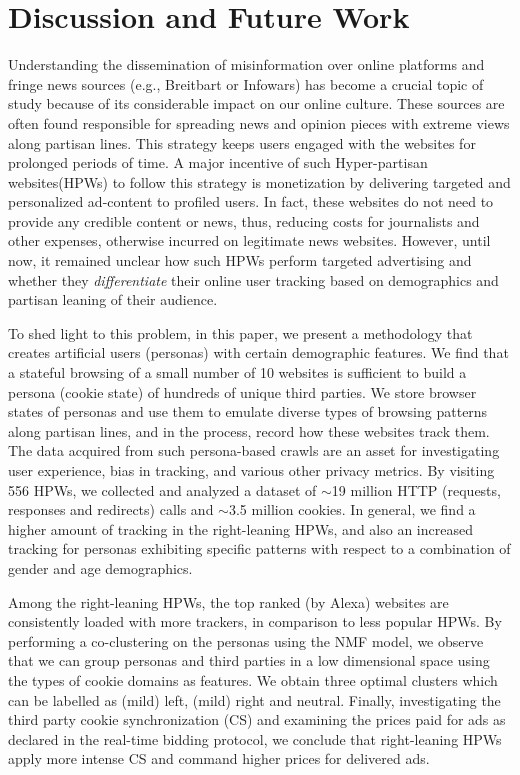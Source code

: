 \documentclass{article}
\newcommand{\hpws}{HPWs\xspace}
\newcommand{\hpwlongs}{Hyper-partisan websites\xspace}
\newcommand{\visitedSites}{556\xspace}
\begin{document}
\section{Discussion and Future Work} \label{sec:conclusion}


Understanding the dissemination of misinformation over online platforms and fringe news sources (e.g., Breitbart or Infowars) has become a crucial topic of study because of its considerable impact on our online culture.
These sources are often found responsible for spreading news and opinion pieces with extreme views along partisan lines.
This strategy keeps users engaged with the websites for prolonged periods of time.
A major incentive of such \hpwlongs (\hpws) to follow this strategy is monetization by delivering targeted and personalized ad-content to profiled users.
In fact, these websites do not need to provide any credible content or news, thus, reducing costs for journalists and other expenses, otherwise incurred on legitimate news websites.
However, until now, it remained unclear how such \hpws perform targeted advertising and whether they \emph{differentiate} their online user tracking based on demographics and partisan leaning of their audience.

To shed light to this problem, in this paper, we present a methodology that creates artificial users (personas) with certain demographic features.
We find that a stateful browsing of a small number of 10 websites is sufficient to build a persona (cookie state) of hundreds of unique third parties.
We store browser states of personas and use them to emulate diverse types of browsing patterns along partisan lines, and in the process, record how these websites track them.
The data acquired from such persona-based crawls are an asset for investigating user experience, bias in tracking, and various other privacy metrics.
By visiting \visitedSites \hpws, we collected and analyzed a dataset of $\sim$19 million HTTP (requests, responses and redirects) calls and $\sim$3.5 million cookies.
In general, we find a higher amount of tracking in the right-leaning \hpws, and also an increased tracking for personas exhibiting specific patterns with respect to a combination of gender and age demographics.

Among the right-leaning \hpws, the top ranked (by Alexa) websites are consistently loaded with more trackers, in comparison to less popular \hpws.
By performing a co-clustering on the personas using the NMF model, we observe that we can group personas and third parties in a low dimensional space using the types of cookie domains as features.
We obtain three optimal clusters which can be labelled as (mild) left, (mild) right and neutral.
Finally, investigating the third party cookie synchronization (CS) and examining the prices paid for ads as declared in the real-time bidding protocol, we conclude that right-leaning \hpws apply more intense CS and command higher prices for delivered ads.
\end{document}
